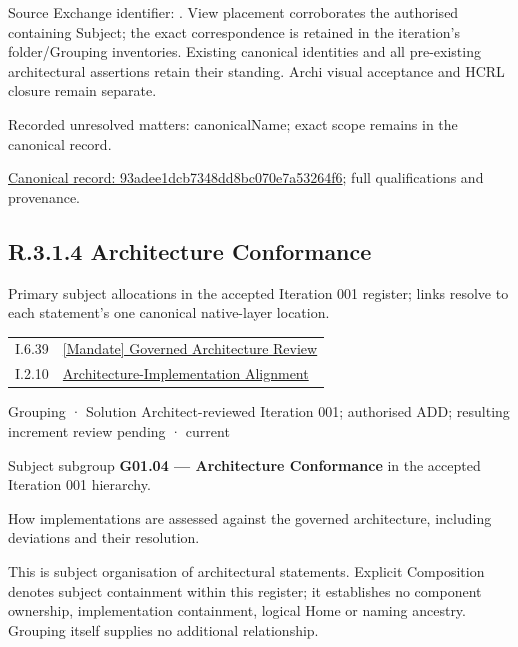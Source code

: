 Source Exchange identifier: \texttt{}. View placement corroborates
the authorised containing Subject; the exact correspondence is retained in the
iteration's folder/Grouping inventories. Existing canonical identities and all
pre-existing architectural assertions retain their standing. Archi visual
acceptance and HCRL closure remain separate.


{\small Recorded unresolved matters: canonicalName; exact scope remains in the canonical record.}\par
{\footnotesize \href{../../../../continuum/grouping/93adee1dcb7348dd8bc070e7a53264f6.md}{Canonical record: 93adee1dcb7348dd8bc070e7a53264f6}; full qualifications and provenance.}\par
\subsection*{R.3.1.4 Architecture Conformance}
\label{navigation:R.3.1.4}

Primary subject allocations in the accepted Iteration 001 register; links resolve to each statement’s one canonical native-layer location.\par
\begin{longtable}{p{.22\linewidth}p{.73\linewidth}}
I.6.39 & \hyperref[element:d30a62f256ae44599841362118a84ec8]{[Mandate] Governed Architecture Review} \\
I.2.10 & \hyperref[element:adf5bd2a409b44099253fbed486d736f]{Architecture-Implementation Alignment} \\
\end{longtable}
\label{element:5989495f1e224d5797054a8b6c0364a1}
{\small Grouping · Solution Architect-reviewed Iteration 001; authorised ADD; resulting increment review pending · current}\par

Subject subgroup \textbf{G01.04 — Architecture Conformance} in the accepted Iteration 001 hierarchy.



How implementations are assessed against the governed architecture, including deviations and their resolution.



This is subject organisation of architectural statements. Explicit Composition denotes subject containment within this register; it establishes no component ownership, implementation containment, logical Home or naming ancestry. Grouping itself supplies no additional relationship.


